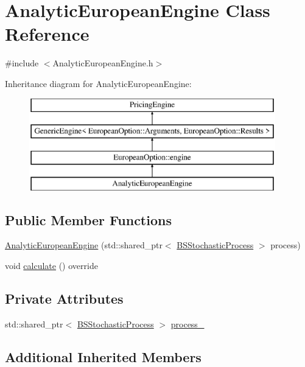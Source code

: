 \hypertarget{class_analytic_european_engine}{}\section{Analytic\+European\+Engine Class Reference}
\label{class_analytic_european_engine}


{\ttfamily \#include $<$Analytic\+European\+Engine.\+h$>$}

Inheritance diagram for Analytic\+European\+Engine\+:\begin{figure}[H]
\begin{center}
\leavevmode
\includegraphics[height=4.000000cm]{class_analytic_european_engine}
\end{center}
\end{figure}
\subsection*{Public Member Functions}
\begin{DoxyCompactItemize}
\item 
\hyperlink{class_analytic_european_engine_ae29c59f14976eaa910d4773d11aa234f}{Analytic\+European\+Engine} (std\+::shared\+\_\+ptr$<$ \hyperlink{class_b_s_stochastic_process}{B\+S\+Stochastic\+Process} $>$ process)
\item 
void \hyperlink{class_analytic_european_engine_adeda22c7b482779d7deaa17037195487}{calculate} () override
\end{DoxyCompactItemize}
\subsection*{Private Attributes}
\begin{DoxyCompactItemize}
\item 
std\+::shared\+\_\+ptr$<$ \hyperlink{class_b_s_stochastic_process}{B\+S\+Stochastic\+Process} $>$ \hyperlink{class_analytic_european_engine_ae9464c6b8aa8b9321b37a8e18b9c785a}{process\+\_\+}
\end{DoxyCompactItemize}
\subsection*{Additional Inherited Members}



